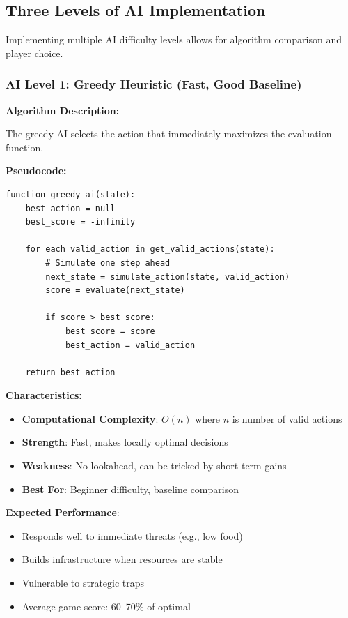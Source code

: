 \documentclass[12pt,a4paper]{article}
\begin{document}
\subsection{Three Levels of AI Implementation}

Implementing multiple AI difficulty levels allows for algorithm comparison and player choice.

\subsubsection{AI Level 1: Greedy Heuristic (Fast, Good Baseline)}

\textbf{Algorithm Description:}

The greedy AI selects the action that immediately maximizes the evaluation function.

\textbf{Pseudocode:}
\begin{lstlisting}
function greedy_ai(state):
    best_action = null
    best_score = -infinity
    
    for each valid_action in get_valid_actions(state):
        # Simulate one step ahead
        next_state = simulate_action(state, valid_action)
        score = evaluate(next_state)
        
        if score > best_score:
            best_score = score
            best_action = valid_action
    
    return best_action
\end{lstlisting}

\textbf{Characteristics:}
\begin{itemize}
    \item \textbf{Computational Complexity}: $O(n)$ where $n$ is number of valid actions
    \item \textbf{Strength}: Fast, makes locally optimal decisions
    \item \textbf{Weakness}: No lookahead, can be tricked by short-term gains
    \item \textbf{Best For}: Beginner difficulty, baseline comparison
\end{itemize}

\textbf{Expected Performance}:
\begin{itemize}
    \item Responds well to immediate threats (e.g., low food)
    \item Builds infrastructure when resources are stable
    \item Vulnerable to strategic traps
    \item Average game score: 60--70\% of optimal
\end{itemize}
\end{document}
